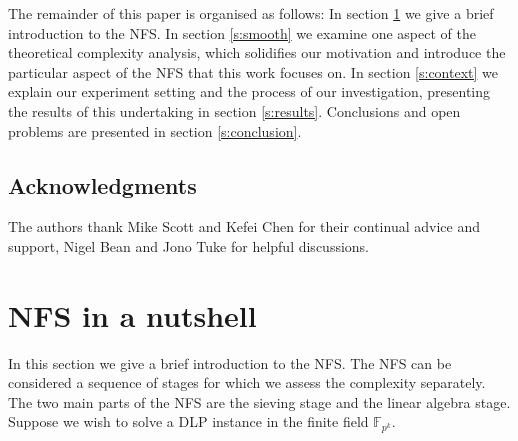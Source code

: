 \documentclass[a4paper, 10pt, envcountsect, runningheads]{lms}
\newcommand{\F}{{\mathbb F}}
\numberwithin{figure}{section}
\numberwithin{equation}{section}
\begin{document}
The remainder of this paper is organised as follows: In section \ref{s:nfs} we give a brief introduction to the NFS. In section \ref{s:smooth} we examine one aspect of the theoretical complexity analysis, which solidifies our motivation and introduce the particular aspect of the NFS that this work focuses on. In section \ref{s:context} we explain our experiment setting and the process of our investigation, presenting the results of this undertaking in section \ref{s:results}. Conclusions and open problems are presented in section \ref{s:conclusion}.
\subsection*{Acknowledgments}
The authors thank Mike Scott and Kefei Chen for their continual advice and support, Nigel Bean and Jono Tuke for helpful discussions.

\section{NFS in a nutshell} 
\label{s:nfs}
In this section we give a brief introduction to the NFS. The NFS can be considered a sequence of stages for which we assess the complexity separately. The two main parts of the NFS are the sieving stage and the linear algebra stage. Suppose we wish to solve a DLP instance in the finite field $\F_{p^k}.$
\end{document}
